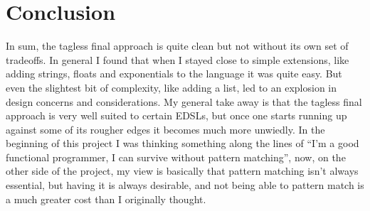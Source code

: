 \documentclass[9pt,letterpaper]{extarticle}
\begin{document}
  \section{Conclusion}
  In sum, the tagless final approach is quite clean but not without its own set
  of tradeoffs. In general I found that when I stayed close to simple
  extensions, like adding strings, floats and exponentials to the language it
  was quite easy. But even the slightest bit of complexity, like adding a list,
  led to an explosion in design concerns and considerations. My general take
  away is that the tagless final approach is very well suited to certain EDSLs,
  but once one starts running up against some of its rougher edges it becomes
  much more unwiedly. In the beginning of this project I was thinking something
  along the lines of ``I'm a good functional programmer, I can survive without
  pattern matching'', now, on the other side of the project, my view is basically
  that pattern matching isn't always essential, but having it is always
  desirable, and not being able to pattern match is a much greater
  cost than I originally thought.
\end{document}
